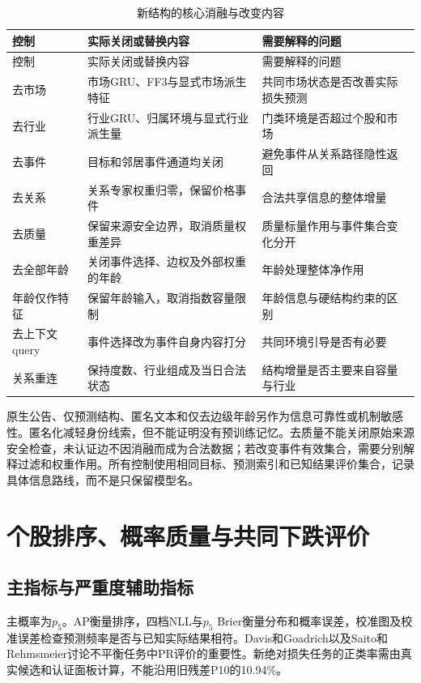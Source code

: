 \begingroup\small
\begin{longtable}{p{3.1cm}p{5.1cm}p{5.1cm}}
\caption{新结构的核心消融与改变内容}\label{tab:ablations}\\
\toprule 控制&实际关闭或替换内容&需要解释的问题\\\midrule\endfirsthead
\toprule 控制&实际关闭或替换内容&需要解释的问题\\\midrule\endhead
去市场&市场GRU、FF3与显式市场派生特征&共同市场状态是否改善实际损失预测\\
去行业&行业GRU、归属环境与显式行业派生量&门类环境是否超过个股和市场\\
去事件&目标和邻居事件通道均关闭&避免事件从关系路径隐性返回\\
去关系&关系专家权重归零，保留价格事件&合法共享信息的整体增量\\
去质量&保留来源安全边界，取消质量权重差异&质量标量作用与事件集合变化分开\\
去全部年龄&关闭事件选择、边权及外部权重的年龄&年龄处理整体净作用\\
年龄仅作特征&保留年龄输入，取消指数容量限制&年龄信息与硬结构约束的区别\\
去上下文query&事件选择改为事件自身内容打分&共同环境引导是否有必要\\
关系重连&保持度数、行业组成及当日合法状态&结构增量是否主要来自容量与行业\\\bottomrule
\end{longtable}
\endgroup

原生公告、仅预测结构、匿名文本和仅去边级年龄另作为信息可靠性或机制敏感性。匿名化减轻身份线索，但不能证明没有预训练记忆。去质量不能关闭原始来源安全检查，未认证边不因消融而成为合法数据；若改变事件有效集合，需要分别解释过滤和权重作用。所有控制使用相同目标、预测索引和已知结果评价集合，记录具体信息路线，而不是只保留模型名。

\section{个股排序、概率质量与共同下跌评价}
\subsection{主指标与严重度辅助指标}
主概率为$p_5$。AP衡量排序，四档NLL与$p_5$ Brier衡量分布和概率误差，校准图及校准误差检查预测频率是否与已知实际结果相符。Davis和Goadrich以及Saito和Rehmsmeier讨论不平衡任务中PR评价的重要性\cite{r28,r29}。新绝对损失任务的正类率需由真实候选和认证面板计算，不能沿用旧残差P10的10.94\%。

